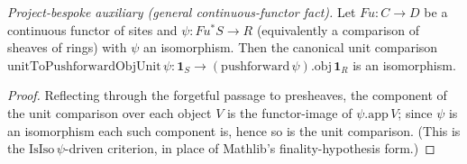
\begin{lemma}
  \label{lem:isIso_unitToPushforwardObjUnit_of_isIso}
  \textit{Project-bespoke auxiliary (general continuous-functor fact).}
  Let \(Fu : C \to D\) be a continuous functor of sites and \(\psi : Fu^{*}S \to R\) (equivalently a
  comparison of sheaves of rings) with \(\psi\) an isomorphism. Then the canonical unit comparison
  \(\mathrm{unitToPushforwardObjUnit}\,\psi : \mathbf{1}_S \to (\mathrm{pushforward}\,\psi).\mathrm{obj}\,
  \mathbf{1}_R\) is an isomorphism.
\end{lemma}
\begin{proof}
  Reflecting through the forgetful passage to presheaves, the component of the unit comparison over each
  object \(V\) is the functor-image of \(\psi.\mathrm{app}\,V\); since \(\psi\) is an isomorphism each
  such component is, hence so is the unit comparison. (This is the \(\mathrm{IsIso}\,\psi\)-driven
  criterion, in place of Mathlib's finality-hypothesis form.)
\end{proof}

